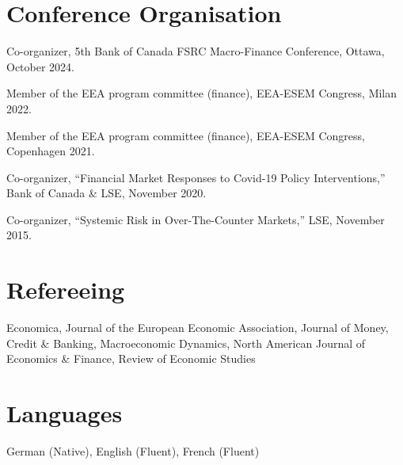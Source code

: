 \documentclass[margin,line, 11pt]{res}
\newenvironment{list1}{
  \begin{list}{\ding{113}}{%
      \setlength{\itemsep}{0in}
      \setlength{\parsep}{0in} \setlength{\parskip}{0in}
      \setlength{\topsep}{0in} \setlength{\partopsep}{0in} 
      \setlength{\leftmargin}{0.17in}}}{\end{list}}
\begin{document}
\begin{resume}
\section{\sc Conference Organisation} 
\begin{list1}
\item[] Co-organizer, 5th Bank of Canada FSRC Macro-Finance Conference, Ottawa, October 2024.
\item[] Member of the EEA program committee (finance), EEA-ESEM Congress, Milan 2022.
\item[] Member of the EEA program committee (finance), EEA-ESEM Congress, Copenhagen 2021.
\item[] Co-organizer, ``Financial Market Responses to Covid-19 Policy Interventions,'' Bank of Canada \& LSE, November 2020.
\item[] Co-organizer, ``Systemic Risk in Over-The-Counter Markets,'' LSE, November 2015.
\end{list1}

\section{\sc Refereeing}
\begin{list1}
\item[] Economica, Journal of the European Economic Association, Journal of Money, Credit \& Banking, Macroeconomic Dynamics, North American Journal of Economics \& Finance, Review of Economic Studies
\end{list1}

\section{\sc Languages}
\begin{list1}
\item[] German (Native), English (Fluent), French (Fluent)
\end{list1}




\end{resume}
\end{document}
